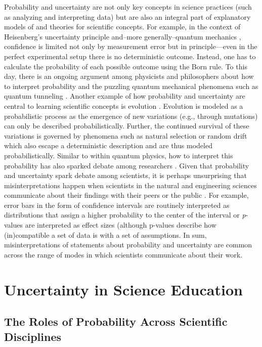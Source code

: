 \documentclass[man]{apa7}
\begin{document}
Probability and uncertainty are not only key concepts in science practices (such as analyzing and interpreting data) but are also an integral part of explanatory models of and theories for scientific concepts. For example, in the context of Heisenberg’s uncertainty principle and--more generally--quantum mechanics \parencite{feynman1951operator}, confidence is limited not only by measurement error but in principle---even in the perfect experimental setup there is no deterministic outcome. Instead, one has to calculate the probability of each possible outcome using the Born rule. 
To this day, there is an ongoing argument among physicists and philosophers about how to interpret probability and the puzzling quantum mechanical phenomena such as quantum tunneling \parencite{c19}. Another example of how probability and uncertainty are central to learning scientific concepts is evolution \parencite{fsnh19}. Evolution is modeled as a probabilistic process as the emergence of new variations (e.g., through mutations) can only be described probabilistically. Further, the continued survival of these variations is governed by phenomena such as natural selection or random drift which also escape a deterministic description and are thus modeled probabilistically. Similar to within quantum physics, how to interpret this probability has also sparked debate among researchers \parencite{m16}. 
Given that probability and uncertainty spark debate among scientists, it is perhaps unsurprising that misinterpretations happen when scientists in the natural and engineering sciences communicate about their findings with their peers or the public \parencite[]{gkv04, c14, mg17}. For example, error bars in the form of confidence intervals are routinely interpreted as distributions that assign a higher probability to the center of the interval \parencite{kl18} or \emph{p}-values are interpreted as effect sizes \parencite{gc17, n14} (although p-values describe how (in)compatible a set of data is with a set of assumptions. In sum, misinterpretations of statements about probability and uncertainty are common across the range of modes in which scientists communicate about their work.

\section{Uncertainty in Science Education}

\subsection{The Roles of Probability Across Scientific Disciplines}
\end{document}
